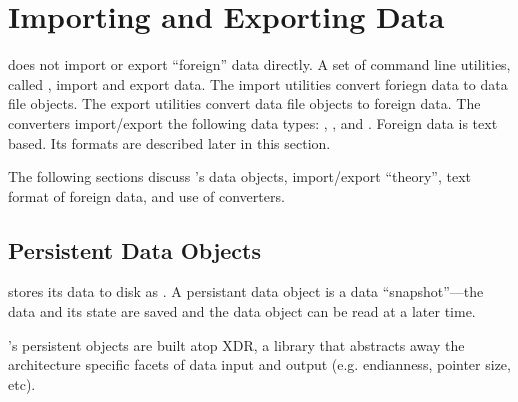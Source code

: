 %
%
%
%
%

\section{Importing and Exporting \sr{} Data}
\label{sec:import_export} 

\sr{} does not import or export ``foreign'' data directly. A set of
command line utilities, called , import and export
data.  The import utilities convert foriegn data to \sr{} data file
objects.  The export utilities convert \sr{} data file objects to
foreign data. The converters import/export the following \sr{} data
types: , , and .
Foreign data is text based.  Its formats are described later in this
section.

The following sections discuss \sr{}'s data objects, import/export
``theory'', text format of foreign data, and use of converters.


\subsection{Persistent Data Objects}
\label{sec:sr_data_object}

\sr{} stores its data to disk as .  A
persistant data object is a data ``snapshot''---the data and its state
are saved and the data object can be read at a later time.

\sr{}'s persistent objects are built atop XDR, a library that
abstracts away the architecture specific facets of data input and
output (e.g. endianness, pointer size, etc).


